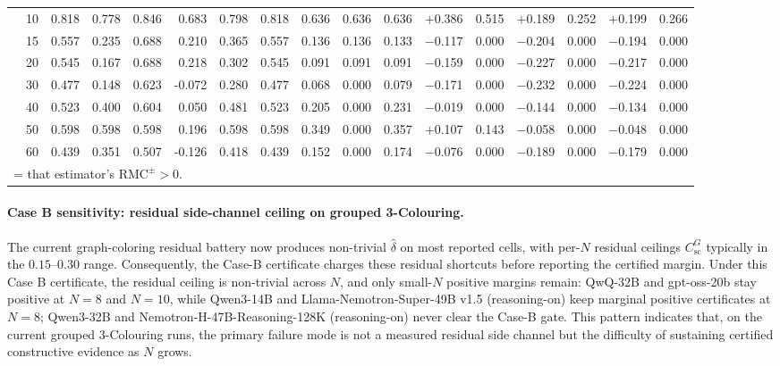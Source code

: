 \documentclass[conference]{IEEEtran}
\theoremstyle{remark}
\newcommand{\RMC}{\mathrm{RMC}}
\newcommand{\shortcutCeiling}{C_{\mathrm{sc}}^{G}}
\begin{document}
\begin{table}[ht]
{\begin{tabular}{p{1.55cm}r rrrr rr rr r rr rr rr}
  & 10 & 0.818 & 0.778 & 0.846 & 0.683 & 0.798 & 0.818 & 0.636 & 0.636 & 0.636 & \cellcolor{green!15}$+$0.386 & \cellcolor{green!15}0.515 & \cellcolor{green!15}$+$0.189 & \cellcolor{green!15}0.252 & \cellcolor{green!15}$+$0.199 & \cellcolor{green!15}0.266 \\
  & 15 & 0.557 & 0.235 & 0.688 & 0.210 & 0.365 & 0.557 & 0.136 & 0.136 & 0.133 & $-$0.117 & 0.000 & $-$0.204 & 0.000 & $-$0.194 & 0.000 \\
  & 20 & 0.545 & 0.167 & 0.688 & 0.218 & 0.302 & 0.545 & 0.091 & 0.091 & 0.091 & $-$0.159 & 0.000 & $-$0.227 & 0.000 & $-$0.217 & 0.000 \\
  & 30 & 0.477 & 0.148 & 0.623 & -0.072 & 0.280 & 0.477 & 0.068 & 0.000 & 0.079 & $-$0.171 & 0.000 & $-$0.232 & 0.000 & $-$0.224 & 0.000 \\
  & 40 & 0.523 & 0.400 & 0.604 & 0.050 & 0.481 & 0.523 & 0.205 & 0.000 & 0.231 & $-$0.019 & 0.000 & $-$0.144 & 0.000 & $-$0.134 & 0.000 \\
  & 50 & 0.598 & 0.598 & 0.598 & 0.196 & 0.598 & 0.598 & 0.349 & 0.000 & 0.357 & \cellcolor{green!15}$+$0.107 & \cellcolor{green!15}0.143 & $-$0.058 & 0.000 & $-$0.048 & 0.000 \\
  & 60 & 0.439 & 0.351 & 0.507 & -0.126 & 0.418 & 0.439 & 0.152 & 0.000 & 0.174 & $-$0.076 & 0.000 & $-$0.189 & 0.000 & $-$0.179 & 0.000 \\
\bottomrule
\multicolumn{17}{l}{\colorbox{green!15}{\phantom{X}} = that estimator's $\RMC^{\pm}>0$.}
\end{tabular}%
}
\end{table}

\paragraph{Case B sensitivity: residual side-channel ceiling on grouped 3-Colouring.}
The current graph-coloring residual battery now produces non-trivial $\hat{\delta}$ on most reported cells, with per-$N$ residual ceilings $\shortcutCeiling$ typically in the $0.15$--$0.30$ range.
Consequently, the Case-B certificate charges these residual shortcuts before reporting the certified margin.
Under this Case B certificate, the residual ceiling is non-trivial across $N$, and only small-$N$ positive margins remain: QwQ-32B and gpt-oss-20b stay positive at $N=8$ and $N=10$, while Qwen3-14B and Llama-Nemotron-Super-49B v1.5 (reasoning-on) keep marginal positive certificates at $N=8$; Qwen3-32B and Nemotron-H-47B-Reasoning-128K (reasoning-on) never clear the Case-B gate.
This pattern indicates that, on the current grouped 3-Colouring runs, the primary failure mode is not a measured residual side channel but the difficulty of sustaining certified constructive evidence as $N$ grows.
\end{document}
